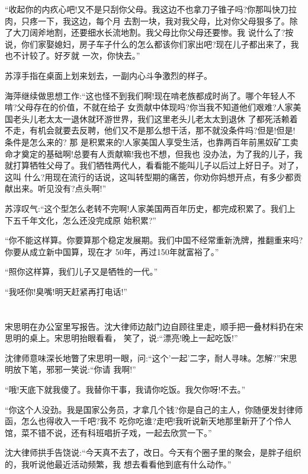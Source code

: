 \documentclass[11pt,a4paper,onecolumn]{article}
\begin{document}
``收起你的内疚心吧!又不是只刮你父母。我这边不也拿刀子锥子吗?你那叫快刀拉肉，只疼一下，我这边，每个月
去割一块，我对我父母，比对你父母狠多了。除了大刀阔斧地割，还要细水长流地割。我父母比你父母还要惨。我
说什么了?按说，你们家娶媳妇，房子车子什么的怎么都该你们家出吧?现在儿子都出来了，我也不计较了。好歹就
一次，你快去。''

苏淳手指在桌面上划来划去，一副内心斗争激烈的样子。

海萍继续做思想工作:``这也怪不到我们啊!现在啃老族都成时尚了。哪个年轻人不啃?父母存在的价值，不就在给子
女贡献中体现吗?你当我不知道他们艰难?人家美国老头儿老太太一退休就环游世界，我们这里老头儿老太太到退休
了都死活赖着不走，有机会就要去反聘，他们又不是那么想干活，那不就没条件吗?但是!但是!条件是怎么来的? 那
是积累来的!人家美国人享受生活，也靠两百年前黑奴矿工卖命才奠定的基础啊!总要有人贡献嘛!我也不想，但我也
没办法，为了我的儿子，我就打算牺牲父母了。我们牺牲两代人，看看能不能叫儿子以后过上好日子。对了，这叫
什么?用现在流行的话说，这叫转型期的痛苦，你劝你妈想开点，有多少都贡献出来。听见没有?点头啊!''

苏淳叹气:``这个型怎么老转不完啊!人家美国两百年历史，都完成积累了。我们上下五千年文化，怎么还没完成原
始积累?''

``你不能这样算。你要算那个稳定发展期。我们中国不经常重新洗牌，推翻重来吗?你要从成立新中国算，现在才
50年，再过150年就富裕了。''

``照你这样算，我们儿子又是牺牲的一代。''

``我呸你!臭嘴!明天赶紧再打电话!''

\section[\thesection]{}

宋思明在办公室里写报告。沈大律师边敲门边自顾往里走，顺手把一叠材料扔在宋思明的桌上。宋思明抬眼看看，
笑了，说:``漂亮!晚上一起吃饭!''

沈律师意味深长地瞥了宋思明一眼，问:``这个'一起'二字，耐人寻味。怎解?''宋思明放下笔，邪邪一笑说:``你请
我啊!''

``哦!天底下就我傻了。我替你干事，我请你吃饭。我欠你呀!不去。''

``你这个人没劲。我是国家公务员，才拿几个钱?你是自己的主人，你随便发封律师函，怎么也得收入一千吧?我不
吃你吃谁?走吧!我听说新天地那里新开了个伶人馆，菜不错不说，还有科班唱折子戏，一起去欣赏一下。''

沈大律师拱手告饶说:``今天真不去了，改日。今天有个圈子里的聚会，是胖子组织的，我听说他最近活动频繁，我
想去看看他到底有什么动作。''
\end{document}
